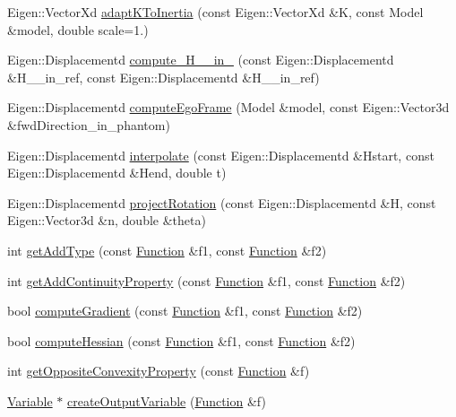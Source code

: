 \begin{DoxyCompactItemize}
\item 
Eigen\+::\+Vector\+Xd \hyperlink{namespaceocra_1_1utils_ad8e0359ef8aba5d4f7de70014e9ab324}{adapt\+K\+To\+Inertia} (const Eigen\+::\+Vector\+Xd \&K, const Model \&model, double scale=1.)
\item 
Eigen\+::\+Displacementd \hyperlink{namespaceocra_1_1utils_a9158ce8ea082d7620fd3204979c75c09}{compute\+\_\+\+H\+\_\+\_\+in\+\_} (const Eigen\+::\+Displacementd \&H\+\_\+\_\+in\+\_\+ref, const Eigen\+::\+Displacementd \&H\+\_\+\_\+in\+\_\+ref)
\item 
Eigen\+::\+Displacementd \hyperlink{namespaceocra_1_1utils_a54960ab215262788c23ca1eee8786b5a}{compute\+Ego\+Frame} (Model \&model, const Eigen\+::\+Vector3d \&fwd\+Direction\+\_\+in\+\_\+phantom)
\item 
Eigen\+::\+Displacementd \hyperlink{namespaceocra_1_1utils_a8d939e7ed429dffde760d84e41258940}{interpolate} (const Eigen\+::\+Displacementd \&Hstart, const Eigen\+::\+Displacementd \&Hend, double t)
\item 
Eigen\+::\+Displacementd \hyperlink{namespaceocra_1_1utils_a0c4be9b19e14fb7dfb9ae92650267dba}{project\+Rotation} (const Eigen\+::\+Displacementd \&H, const Eigen\+::\+Vector3d \&n, double \&theta)
\item 
int \hyperlink{namespaceocra_1_1utils_a71c5c6a8257c9a5bc5cc84e9a4fc2e68}{get\+Add\+Type} (const \hyperlink{classocra_1_1Function}{Function} \&f1, const \hyperlink{classocra_1_1Function}{Function} \&f2)
\item 
int \hyperlink{namespaceocra_1_1utils_a176daae05084971fbcba56c06170cb25}{get\+Add\+Continuity\+Property} (const \hyperlink{classocra_1_1Function}{Function} \&f1, const \hyperlink{classocra_1_1Function}{Function} \&f2)
\item 
bool \hyperlink{namespaceocra_1_1utils_a02a6c3a9f1fe61b2ae034dee1b75a795}{compute\+Gradient} (const \hyperlink{classocra_1_1Function}{Function} \&f1, const \hyperlink{classocra_1_1Function}{Function} \&f2)
\item 
bool \hyperlink{namespaceocra_1_1utils_a3fba5c6f77b54b0eee4cdd49f7991957}{compute\+Hessian} (const \hyperlink{classocra_1_1Function}{Function} \&f1, const \hyperlink{classocra_1_1Function}{Function} \&f2)
\item 
int \hyperlink{namespaceocra_1_1utils_a7a11f7cb798c473b72d7677b83ed859e}{get\+Opposite\+Convexity\+Property} (const \hyperlink{classocra_1_1Function}{Function} \&f)
\item 
\hyperlink{classocra_1_1Variable}{Variable} $\ast$ \hyperlink{namespaceocra_1_1utils_ab8a4ac5aa3bfae2c0732c7abd21a84c9}{create\+Output\+Variable} (\hyperlink{classocra_1_1Function}{Function} \&f)

\end{DoxyCompactItemize}
